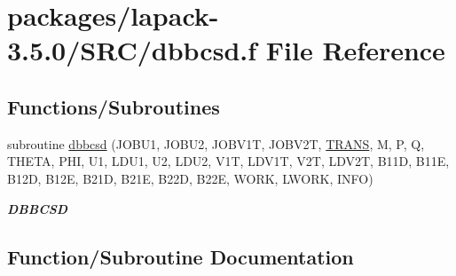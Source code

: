 \hypertarget{dbbcsd_8f}{}\section{packages/lapack-\/3.5.0/\+S\+R\+C/dbbcsd.f File Reference}
\label{dbbcsd_8f}
\subsection*{Functions/\+Subroutines}
\begin{DoxyCompactItemize}
\item 
subroutine \hyperlink{dbbcsd_8f_a27a367582a76c7b48a8bf3eed068e216}{dbbcsd} (J\+O\+B\+U1, J\+O\+B\+U2, J\+O\+B\+V1\+T, J\+O\+B\+V2\+T, \hyperlink{superlu__enum__consts_8h_a0c4e17b2d5cea33f9991ccc6a6678d62a1f61e3015bfe0f0c2c3fda4c5a0cdf58}{T\+R\+A\+N\+S}, M, P, Q, T\+H\+E\+T\+A, P\+H\+I, U1, L\+D\+U1, U2, L\+D\+U2, V1\+T, L\+D\+V1\+T, V2\+T, L\+D\+V2\+T, B11\+D, B11\+E, B12\+D, B12\+E, B21\+D, B21\+E, B22\+D, B22\+E, W\+O\+R\+K, L\+W\+O\+R\+K, I\+N\+F\+O)
\begin{DoxyCompactList}\small\item\em {\bfseries D\+B\+B\+C\+S\+D} \end{DoxyCompactList}\end{DoxyCompactItemize}


\subsection{Function/\+Subroutine Documentation}
\hypertarget{dbbcsd_8f_a27a367582a76c7b48a8bf3eed068e216}{}
